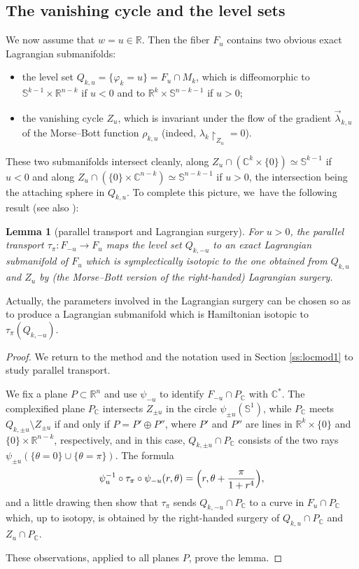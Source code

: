 \documentclass[10pt]{amsart}
\newcommand{\C}{{\mathbb C}}
\newcommand{\R}{{\mathbb R}}
\newcommand{\bS}{{\mathbb S}}
\newcommand{\tu}[1]{\textup{#1}}
\newcommand{\rst}[1]{{\upharpoonright}_{\!#1}}
\let\on\colon
\theoremstyle{plain}
\newtheorem{lemma}[theorem]{Lemma}
\theoremstyle{definition}
\begin{document}
\smallskip

\subsection{The vanishing cycle and the level sets} \label{ss:locmod3}

We now assume that $w=u \in \R$. Then the fiber $F_u$ contains two obvious exact
Lagrangian submanifolds:
\begin{itemize}
\item
the level set $Q_{k,u} = \{\varphi_k=u\} = F_u \cap M_k$, which is diffeomorphic
to $\bS^{k-1} \times \R^{n-k}$ if $u<0$ and to $\R^k \times \bS^{n-k-1}$ if $u>0$;
\item
the vanishing cycle $Z_u$, which is invariant under the flow of the gradient
$\vec\lambda_{k,u}$ of the Morse--Bott function $\rho_{k,u}$ (indeed, $\lambda_k
\rst{ Z_u } = 0$).
\end{itemize}
These two submanifolds intersect cleanly, along $Z_u \cap (\C^k \times \{0\})
\simeq \bS^{k-1}$ if $u<0$ and along $Z_u \cap (\{0\} \times \C^{n-k}) \simeq
\bS^{n-k-1}$ if $u>0$, the intersection being the attaching sphere in $Q_{k,u}$.
To complete this picture, we~have the following result (see also \cite[Th.\,1.8.4]{Sr}):

\begin{lemma}[parallel transport and Lagrangian surgery] \label{l:surgery}
For $u>0$, the parallel transport $\tau_\pi \on F_{-u} \to F_u$ maps the level
set $Q_{k,-u}$ to an exact Lagrangian submanifold of $F_u$ which is
symplectically isotopic to the one obtained from $Q_{k,u}$ and $Z_u$ by \tu(the
Morse--Bott version of the right-handed\tu) Lagrangian surgery.
\end{lemma}

Actually, the parameters involved in the Lagrangian surgery can be chosen so as
to produce a Lagrangian submanifold which is Hamiltonian isotopic to $\tau_\pi
(Q_{k,-u})$.

\begin{proof}
We return to the method and the notation used in Section \ref{ss:locmod1} to
study parallel transport.

We fix a plane $P \subset \R^n$ and use $\psi_{-u}$ to identify $F_{-u} \cap
P_\C$ with $\C^*$. The complexified plane $P_\C$ intersects $Z_{\pm u}$ in the
circle $\psi_{\pm u}(\bS^1)$, while $P_\C$ meets $Q_{k,\pm u} \setminus Z_{\pm u}$ if and
only if $P = P' \oplus P''$, where $P'$ and $P''$ are lines in $\R^k \times
\{0\}$ and $\{0\} \times \R^{n-k}$, respectively, and in this case, $Q_{k,\pm u}
\cap P_\C$ consists of the two rays $\psi_{\pm u} (\{\theta = 0\} \cup \{\theta
= \pi\})$. The formula
\[
\psi_u^{-1} \circ \tau_\pi \circ \psi_{-u} (r,\theta)
 = \Bigl(r, \theta + \frac{\pi}{1+r^4}\Bigr),
\]
and a little drawing then show that $\tau_\pi$ sends $Q_{k,-u} \cap P_\C$ to a
curve in $F_u \cap P_\C$ which, up to isotopy, is obtained by the right-handed
surgery of $Q_{k,u} \cap P_\C$ and $Z_u \cap P_\C$.

These observations, applied to all planes $P$, prove the lemma.
\end{proof}
\end{document}
